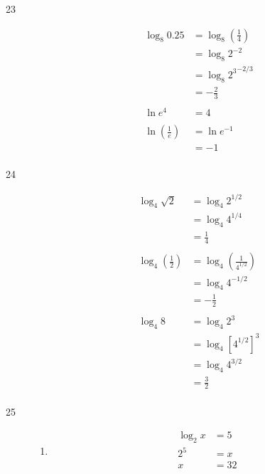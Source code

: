 \documentclass{exam}
\begin{document}
\begin{description}
    \item[23]
      \begin{align*}
        \log_{8} 0.25 &= \log_8 \left( \frac{1}{4} \right) \\
                      &= \log_8 2^{-2} \\
                      &= \log_8 {2^3}^{-2/3} \\
                      &= \boxed{-\frac{2}{3}} \\
        \\
        \ln e^4 &= \boxed{4} \\
        \\
        \ln \left( \frac{1}{e} \right) &= \ln e^{-1} \\
                                       &= \boxed{-1} \\
      \end{align*}

    \item[24]
      \begin{align*}
        \log_4 \sqrt{2} &= \log_4 2^{1/2} \\
                        &= \log_4 4^{1/4} \\
                        &= \boxed{\frac{1}{4}} \\
        \\
        \log_4 \left( \frac{1}{2} \right) &= \log_4 \left( \frac{1}{4^{1/2}} \right) \\
                                          &= \log_4 4^{-1/2} \\
                                          &= \boxed{-\frac{1}{2}} \\
        \\
        \log_4 8 &= \log_4 2^3 \\
                 &= \log_4 \left[ 4^{1/2} \right]^3 \\
                 &= \log_4 4^{3/2} \\
                 &= \boxed{\frac{3}{2}} \\
      \end{align*}

    \item[25]
      \begin{enumerate}[a]
        \item 
          \begin{align*}
            \log_2 x &= 5 \\
            2^5      &= x \\
            x        &= \boxed{32} \\
          \end{align*}


\end{enumerate}
\end{description}
\end{document}
